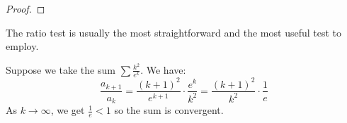 \begin{itemize}
\begin{proof}
    \end{proof}
    \begin{tip}
        The ratio test is usually the most straightforward and the most useful test to employ.
    \end{tip}
    \begin{example}
        Suppose we take the sum $\sum \frac{k^2}{e^k}$. We have:
        \begin{equation}
            \frac{a_{k+1}}{a_k} = \frac{(k+1)^2}{e^{k+1}} \cdot \frac{e^k}{k^2} = \frac{(k+1)^2}{k^2} \cdot \frac{1}{e}
        \end{equation}
        As $k\to\infty$, we get $\frac{1}{e}<1$ so the sum is convergent.
    \end{example}
\end{itemize}